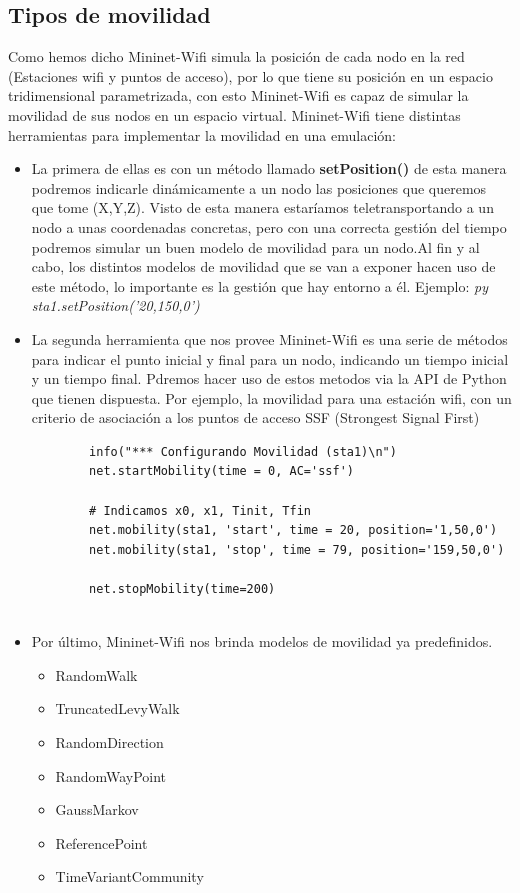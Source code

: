 \subsection{Tipos de movilidad}
Como hemos dicho Mininet-Wifi simula la posición de cada nodo en la red (Estaciones wifi y puntos de acceso), por lo que tiene su posición en un espacio tridimensional parametrizada, con esto Mininet-Wifi es capaz de simular la movilidad de sus nodos en un espacio virtual. Mininet-Wifi tiene distintas herramientas para implementar la movilidad en una emulación:
\begin{itemize}
    \item La primera de ellas es con un método llamado \textbf{setPosition()} de esta manera podremos indicarle dinámicamente a un nodo las posiciones que queremos que tome (X,Y,Z). Visto de esta manera estaríamos teletransportando a un nodo a unas coordenadas concretas, pero con una correcta gestión del tiempo podremos simular un buen modelo de movilidad para un nodo.Al fin y al cabo, los distintos modelos de movilidad que se van a exponer hacen uso de este método, lo importante es la gestión que hay entorno a él. Ejemplo: \textit{py sta1.setPosition('20,150,0')}
    \item La segunda herramienta que nos provee Mininet-Wifi es una serie de métodos para indicar el punto inicial y final para un nodo, indicando un tiempo inicial y un tiempo final. Pdremos hacer uso de estos metodos via la API de Python que tienen dispuesta. Por ejemplo, la movilidad para una estación wifi, con un criterio de asociación a los puntos de acceso SSF (Strongest Signal First)
    \begin{verbatim}
        info("*** Configurando Movilidad (sta1)\n")
        net.startMobility(time = 0, AC='ssf')
        
        # Indicamos x0, x1, Tinit, Tfin
        net.mobility(sta1, 'start', time = 20, position='1,50,0')
        net.mobility(sta1, 'stop', time = 79, position='159,50,0')
        
        net.stopMobility(time=200)
        
    \end{verbatim}
    \newpage
    \item Por último, Mininet-Wifi nos brinda modelos de movilidad ya predefinidos.
        \begin{itemize}
            \item RandomWalk
            \item TruncatedLevyWalk
            \item RandomDirection
            \item RandomWayPoint
            \item GaussMarkov
            \item ReferencePoint 
            \item TimeVariantCommunity
        \end{itemize}
\end{itemize}
